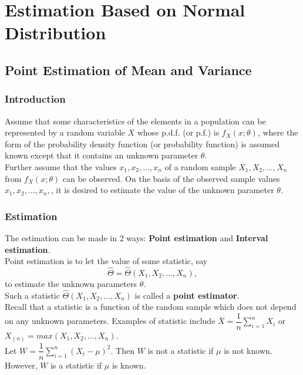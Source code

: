 \chapter{Estimation Based on Normal Distribution}

\section{Point Estimation of Mean and Variance}
\subsection{Introduction}
Assume that some characteristics of the elements in a population can be represented by a random variable $X$ whose p.d.f. (or p.f.) is $f_X(x; \theta)$, where the form of the probability density function (or probability function) is assumed known except that it contains an unknown parameter $\theta$. \\
Further assume that the values $x_1, x_2, \dots, x_n$ of a random sample $X_1, X_2, \dots, X_n$ from $f_X(x; \theta)$ can be observed. On the basis of the observed sample values $x_1, x_2, \dots, x_n,$, it is desired to estimate the value of the unknown parameter $\theta$.

\subsection{Estimation}
The estimation can be made in 2 ways: \textbf{Point estimation} and \textbf{Interval estimation}. \\
Point estimation is to let the value of some statistic, say
$$
\hat{\Theta} = \hat{\Theta}(X_1, X_2, \dots, X_n),
$$
to estimate the unknown parameters $\theta$. \\
Such a statistic $\hat{\Theta}(X_1, X_2, \dots, X_n)$ is called a \textbf{point estimator}.\\
Recall that a statistic is a function of the random sample which does not depend on any unknown parameters. Examples of statistic include $\bar{X} = \dfrac{1}{n} \sum_{i = 1}^n X_i$ or $X_{(n)} = max(X_1, X_2, \dots, X_n)$. \\
Let $W = \dfrac{1}{n} \sum_{i = 1}^n (X_i - \mu)^2$. Then $W$ is not a statistic if $\mu$ is not known. However, $W$ is a statistic if $\mu$ is known.

